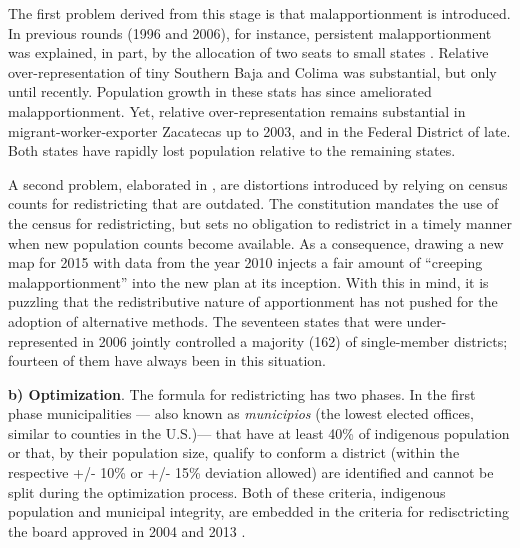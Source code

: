 \documentclass[letter,12pt]{article}
\begin{document}
The first problem derived from this stage is that malapportionment is introduced. In previous rounds (1996 and 2006), for instance, persistent malapportionment was explained, in part, by the allocation of two seats to small states \citep{magar.etalBiasMultiParty2015}. Relative over-representation of tiny Southern Baja and Colima was substantial, but only until recently. Population growth in these stats has since ameliorated malapportionment. Yet, relative over-representation remains substantial in migrant-worker-exporter Zacatecas up to 2003, and in the Federal District of late. Both states have rapidly lost population relative to the remaining states.

A second problem, elaborated in \citep{magar.etalBiasMultiParty2015}, are distortions introduced by relying on census counts for redistricting that are outdated. The constitution mandates the use of the census for redistricting, but sets no obligation to redistrict in a timely manner when new population counts become available. As a consequence, drawing a new map for 2015 with data from the year 2010 injects a fair amount of ``creeping malapportionment'' into the new plan at its inception. With this in mind, it is puzzling that the redistributive nature of apportionment has not pushed for the adoption of alternative methods. The seventeen states that were under-represented in 2006 jointly controlled a majority (162) of single-member districts; fourteen of them have always been in this situation. 

\textbf{b) Optimization}. The formula for redistricting has two phases. In the first phase municipalities --- also known as \emph{municipios} (the lowest elected offices, similar to counties in the U.S.)---  that have at least 40\% of indigenous population or that, by their population size, qualify to conform a district (within the respective +/- 10\% or  +/- 15\% deviation allowed) are identified and cannot be split during the optimization process. Both of these criteria, indigenous population and municipal integrity, are embedded in the criteria for redisctricting the board approved in 2004 and 2013 \citep{acuerdo.ife.2004,acuerdo.ife.2013}. 
\end{document}

